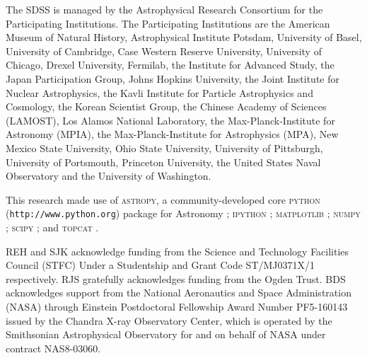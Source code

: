 \documentclass[usenatbib]{mn2e}
\begin{document}
The SDSS is managed by the Astrophysical Research Consortium for the Participating Institutions. The Participating Institutions are the American Museum of Natural History, Astrophysical  Institute Potsdam, University of Basel, University of Cambridge, 
Case Western Reserve University, University of Chicago, Drexel University, Fermilab, the Institute for Advanced Study, the Japan 
Participation Group, Johns Hopkins University, the Joint Institute for Nuclear Astrophysics, the Kavli Institute for Particle Astrophysics and Cosmology, the Korean Scientist Group, the Chinese Academy of Sciences (LAMOST), Los Alamos National Laboratory, the Max-Planck-Institute for Astronomy (MPIA), the Max-Planck-Institute for Astrophysics (MPA), New Mexico State University, Ohio State University, University of Pittsburgh, University of Portsmouth, Princeton University, the United States Naval Observatory and the University of Washington. 

This research made use of \textsc{astropy}, a community-developed core \textsc{python} ({\tt http://www.python.org}) package for Astronomy \citep{2013A&A...558A..33A}; \textsc{ipython} \citep{PER-GRA:2007}; \textsc{matplotlib} \citep{Hunter:2007}; \textsc{numpy} \citep{:/content/aip/journal/cise/13/2/10.1109/MCSE.2011.37}; \textsc{scipy} \citep{citescipy}; and \textsc{topcat} \citep{2005ASPC..347...29T}.

REH and SJK acknowledge funding from the Science and Technology Facilities Council (STFC) Under a Studentship and Grant Code ST/MJ0371X/1 respectively. RJS gratefully acknowledges funding from the Ogden Trust. BDS acknowledges support from the National Aeronautics and Space Administration (NASA) through Einstein Postdoctoral Fellowship Award Number PF5-160143 issued by the Chandra X-ray Observatory Center, which is operated by the Smithsonian Astrophysical Observatory for and on behalf of NASA under contract NAS8-03060.

{}

\end{document}
